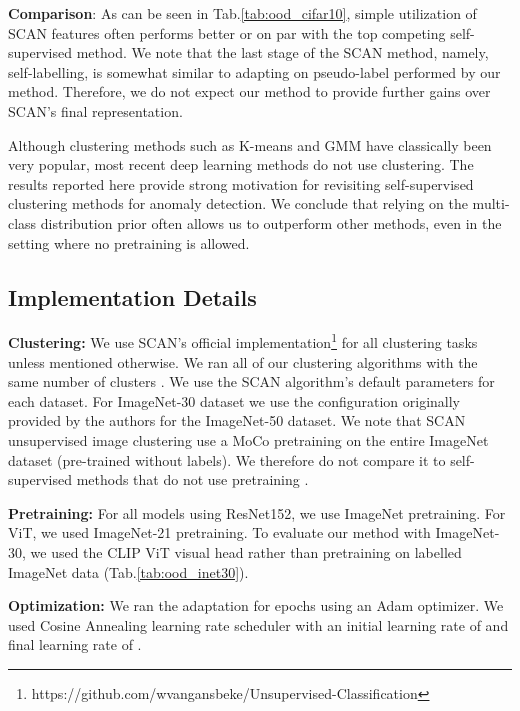 \documentclass[runningheads]{llncs}
\begin{document}
\noindent\textbf{Comparison}: As can be seen in Tab.\ref{tab:ood_cifar10}, simple utilization of SCAN features often performs better or on par with the top competing self-supervised method. We note that the last stage of the SCAN method, namely, self-labelling, is somewhat similar to adapting on pseudo-label performed by our method. Therefore, we do not expect our method to provide further gains over SCAN's final representation. 


Although clustering methods such as K-means and GMM have classically been very popular, most recent deep learning methods do not use clustering. The results reported here provide strong motivation for revisiting self-supervised clustering methods for anomaly detection. We conclude that relying on the multi-class distribution prior often allows us to outperform other methods, even in the setting where no pretraining is allowed.

\subsection{Implementation Details}
\label{sec:impl_det}

\noindent\textbf{Clustering:} We use SCAN's official implementation\footnote{https://github.com/wvangansbeke/Unsupervised-Classification} for all clustering tasks unless mentioned otherwise. We ran all of our clustering algorithms with the same number of clusters . We use the SCAN algorithm's default parameters for each dataset. For ImageNet-30 dataset we use the configuration originally provided by the authors for the ImageNet-50 dataset. We note that SCAN unsupervised image clustering use a MoCo\cite{chen2020improved} pretraining on the entire ImageNet dataset (pre-trained without labels). We therefore do not compare it to self-supervised methods that do not use pretraining \cite{hendrycks2019using,bergman2020classification,tack2020csi,sehwag2021ssd}.


\noindent\textbf{Pretraining:} For all models using ResNet152, we use ImageNet\cite{deng2009imagenet} pretraining. For ViT, we used ImageNet-21\cite{kolesnikov2020big} pretraining. To evaluate our method with ImageNet-30, we used the CLIP \cite{radford2021learning} ViT visual head rather than pretraining on labelled ImageNet data (Tab.\ref{tab:ood_inet30}).

\noindent\textbf{Optimization:} We ran the adaptation for  epochs using an Adam optimizer. We used Cosine Annealing learning rate scheduler with an initial learning rate of  and final learning rate of .
\end{document}
